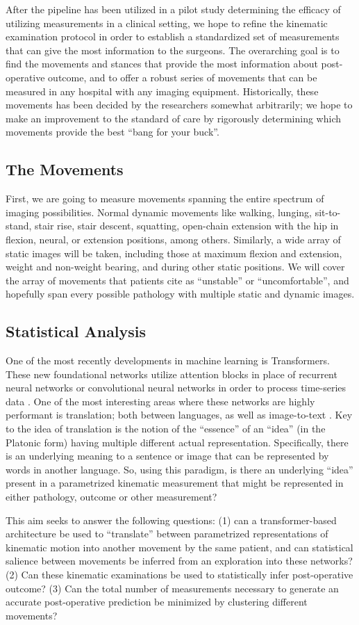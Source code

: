 After the pipeline has been utilized in a pilot study determining the efficacy of utilizing measurements in a clinical setting, we hope to refine the kinematic examination protocol in order to establish a standardized set of measurements that can give the most information to the surgeons. The overarching goal is to find the movements and stances that provide the most information about post-operative outcome, and to offer a robust series of movements that can be measured in any hospital with any imaging equipment. Historically, these movements has been decided by the researchers somewhat arbitrarily; we hope to make an improvement to the standard of care by rigorously determining which movements provide the best ``bang for your buck''.

\subsection{The Movements}
First, we are going to measure movements spanning the entire spectrum of imaging possibilities. Normal dynamic movements like walking, lunging, sit-to-stand, stair rise, stair descent, squatting, open-chain extension with the hip in flexion, neural, or extension positions, among others. Similarly, a wide array of static images will be taken, including those at maximum flexion and extension, weight and non-weight bearing, and during other static positions. We will cover the array of movements that patients cite as ``unstable'' or ``uncomfortable'', and hopefully span every possible pathology with multiple static and dynamic images.

\subsection{Statistical Analysis}

One of the most recently developments in machine learning is Transformers. These new foundational networks utilize attention blocks in place of recurrent neural networks or convolutional neural networks in order to process time-series data \cite{vaswaniAttentionAllYou2017}. One of the most interesting areas where these networks are highly performant is translation; both between languages, as well as image-to-text \cite{dosovitskiyImageWorth16x162021}. Key to the idea of translation is the notion of the ``essence'' of an ``idea'' (in the Platonic form) having multiple different actual representation. Specifically, there is an underlying meaning to a sentence or image that can be represented by words in another language. So, using this paradigm, is there an underlying ``idea'' present in a parametrized kinematic measurement that might be represented in either pathology, outcome or other measurement?

This aim seeks to answer the following questions: (1) can a transformer-based architecture be used to ``translate'' between parametrized representations of kinematic motion into another movement by the same patient, and can statistical salience between movements be inferred from an exploration into these networks? (2) Can these kinematic examinations be used to statistically infer post-operative outcome? (3) Can the total number of measurements necessary to generate an accurate post-operative prediction be minimized by clustering different movements?